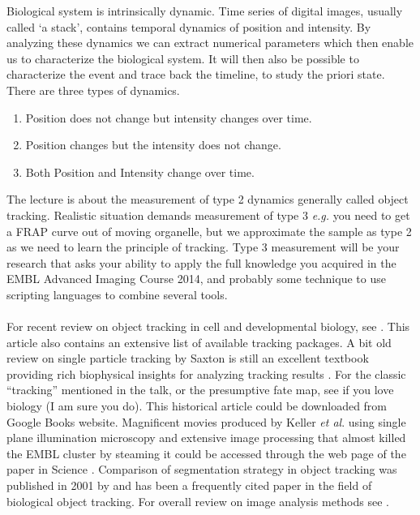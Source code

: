 \documentclass[11pnt]{article}
\begin{document}
Biological system is intrinsically dynamic. Time series of digital images, usually called ‘a stack’, contains temporal dynamics of position and intensity. By analyzing these dynamics we can extract numerical parameters which then enable us to characterize the biological system. It will then also be possible to characterize the event and trace back the timeline, to study the priori state. There are three types of dynamics. 
\begin{enumerate}
\item Position does not change but intensity changes over time. 
\item Position changes but the intensity does not change. 
\item Both Position and Intensity change over time. 
\end{enumerate}
The lecture is about the measurement of type 2 dynamics generally called object tracking. Realistic situation demands measurement of type 3 \textit{e.g.} you need to get a FRAP curve out of moving organelle, but we approximate the sample as type 2 as we need to learn the principle of tracking. Type 3 measurement will be your research that asks your ability to apply the full knowledge you acquired in the EMBL Advanced Imaging Course 2014, and probably some technique to use scripting languages to combine several tools.  
\\
\\
For recent review on object tracking in cell and developmental biology, see \cite{Meijering2012}. This article also contains an extensive list of available tracking packages. A bit old review on single particle tracking by Saxton is still an excellent textbook providing rich biophysical insights for analyzing tracking results \citep{Saxton1997}. For the classic ``tracking'' mentioned in the talk, or the presumptive fate map, see \cite{Vogt1925} if you love biology (I am sure you do). This historical article could be downloaded from Google Books website. Magnificent movies produced by Keller \textit{et al}. using single plane illumination microscopy and extensive image processing that almost killed the EMBL cluster by steaming it could be accessed through the web page of the paper in Science \citep{Keller2008}. Comparison of segmentation strategy in object tracking was published in 2001 by \cite{Cheezum2001a} and has been a frequently cited paper in the field of biological object tracking. For overall review on image analysis methods see \cite{Hamilton2009}.
\end{document}
